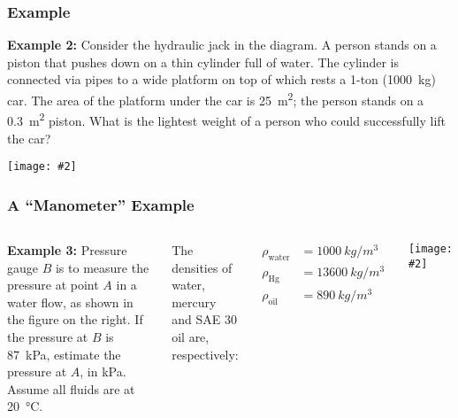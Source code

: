 \documentclass[12pt,aspectratio=169]{beamer}
\newcommand{\pic}[2]{\texttt{[image: \#2]}}
\begin{document}
\begin{frame}
  \frametitle{Example}
  \textbf{Example 2:} Consider the hydraulic jack in the diagram. A person
  stands on a piston that pushes down on a thin cylinder full of water. The
  cylinder is connected via pipes to a wide platform on top of which rests a
  1-ton (\SI{1000}{kg}) car. The area of the platform under the car is
  \SI{25}{m^2}; the person stands on a \SI{0.3}{m^2} piston. What is the
  lightest weight of a person who could successfully lift the car?
  \begin{center}
    \vspace{-.2in}
    \pic{.4}{jack.png}
    
  \end{center}
\end{frame}



\begin{frame}
  \frametitle{A ``Manometer'' Example}
  \begin{columns}

    \textbf{Example 3:} Pressure gauge $B$ is to measure the pressure at point
    $A$ in a water flow, as shown in the figure on the right. If the pressure at
    $B$ is \SI{87}{\kilo\pascal}, estimate the pressure at $A$, in
    \si{\kilo\pascal}. Assume all fluids are at \SI{20}{\celsius}.

    \vspace{.1in}The densities of water, mercury and SAE 30 oil are,
    respectively:

    \vspace{-.3in}
    \begin{align*}
      \rho_\mathrm{water}&=\SI{1000}{kg/m^3}\\
      \rho_\mathrm{Hg}&=\SI{13600}{kg/m^3}\\
      \rho_\mathrm{oil}&=\SI{890}{kg/m^3}
    \end{align*}
    
    \pic{1}{mano.jpg}
  \end{columns}
\end{frame}
\end{document}
